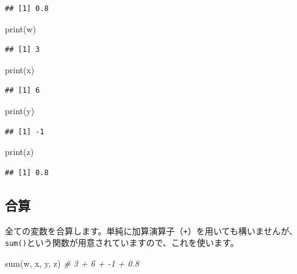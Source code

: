 \documentclass[
  12pt,
]{book}
\newenvironment{Shaded}{\begin{snugshade}}{\end{snugshade}}
\newcommand{\CommentTok}[1]{\textcolor[rgb]{0.56,0.35,0.01}{\textit{#1}}}
\newcommand{\FunctionTok}[1]{\textcolor[rgb]{0.00,0.00,0.00}{#1}}
\newcommand{\NormalTok}[1]{#1}
\begin{document}
\begin{verbatim}
## [1] 0.8
\end{verbatim}

\begin{Shaded}
\begin{Highlighting}[]
\FunctionTok{print}\NormalTok{(w)}
\end{Highlighting}
\end{Shaded}

\begin{verbatim}
## [1] 3
\end{verbatim}

\begin{Shaded}
\begin{Highlighting}[]
\FunctionTok{print}\NormalTok{(x)}
\end{Highlighting}
\end{Shaded}

\begin{verbatim}
## [1] 6
\end{verbatim}

\begin{Shaded}
\begin{Highlighting}[]
\FunctionTok{print}\NormalTok{(y)}
\end{Highlighting}
\end{Shaded}

\begin{verbatim}
## [1] -1
\end{verbatim}

\begin{Shaded}
\begin{Highlighting}[]
\FunctionTok{print}\NormalTok{(z)}
\end{Highlighting}
\end{Shaded}

\begin{verbatim}
## [1] 0.8
\end{verbatim}

\hypertarget{ux5408ux7b97}{%
\subsection{合算}\label{ux5408ux7b97}}

全ての変数を合算します。単純に加算演算子（\texttt{+}）を用いても構いませんが、\texttt{sum()}という関数が用意されていますので、これを使います。

\begin{Shaded}
\begin{Highlighting}[]
\FunctionTok{sum}\NormalTok{(w, x, y, z)    }\CommentTok{\# 3 + 6 + {-}1 + 0.8}
\end{Highlighting}
\end{Shaded}
\end{document}
